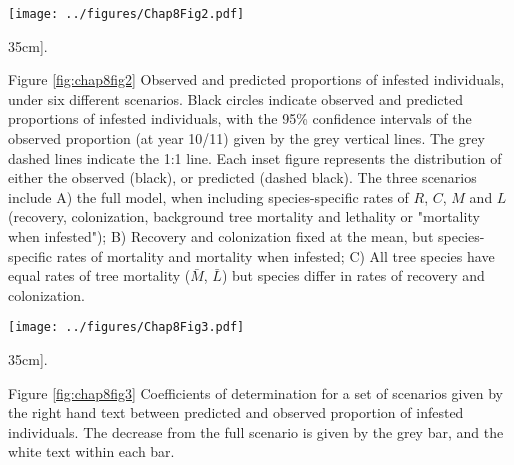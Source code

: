 \documentclass[b5paper,justified]{tufte-book} %
\begin{document}
\begin{fullwidth}
\begin{landscape}
\begin{figure*}
\hspace*{4cm}\texttt{[image: ../figures/Chap8Fig2.pdf]}
\caption[The effects of liana infestation on expected demographic rates as a function of tree size][35cm]{.}
\label{fig:chap8fig2}
\vspace*{0.3cm}
\hspace*{4cm}\begin{minipage}{20cm}
\footnotesize Figure \ref{fig:chap8fig2} 
Observed and predicted proportions of infested individuals, under six different scenarios. Black circles indicate observed and predicted proportions of infested individuals, with the 95\% confidence intervals of the observed proportion (at year 10/11) given by the grey vertical lines. The grey dashed lines indicate the 1:1 line. Each inset figure represents the distribution of either the observed (black), or predicted (dashed black).  The three scenarios include A) the full model, when including species-specific rates of $R$, $C$, $M$ and $L$ (recovery, colonization, background tree mortality and lethality or "mortality when infested"); B) Recovery and colonization fixed at the mean, but species-specific rates of mortality and mortality when infested; C) All tree species have equal rates of tree mortality ($\bar{M}$, $\bar{L}$) but species differ in rates of recovery and colonization.
\end{minipage}
\end{figure*}
\end{landscape}

\begin{figure*}
\hspace*{.1cm}\texttt{[image: ../figures/Chap8Fig3.pdf]}
\caption[Coefficients of determination for a set of scenarios][35cm]{.}
\label{fig:chap8fig3}
\vspace*{0.3cm}
\hspace*{.5cm}\begin{minipage}{14cm}
\footnotesize Figure \ref{fig:chap8fig3} 
Coefficients of determination for a set of scenarios given by the right hand text between predicted and observed proportion of infested individuals. The decrease from the full scenario is given by the grey bar, and the white text within each bar. 
\end{minipage}
\end{figure*}


\end{fullwidth}
\end{document}
